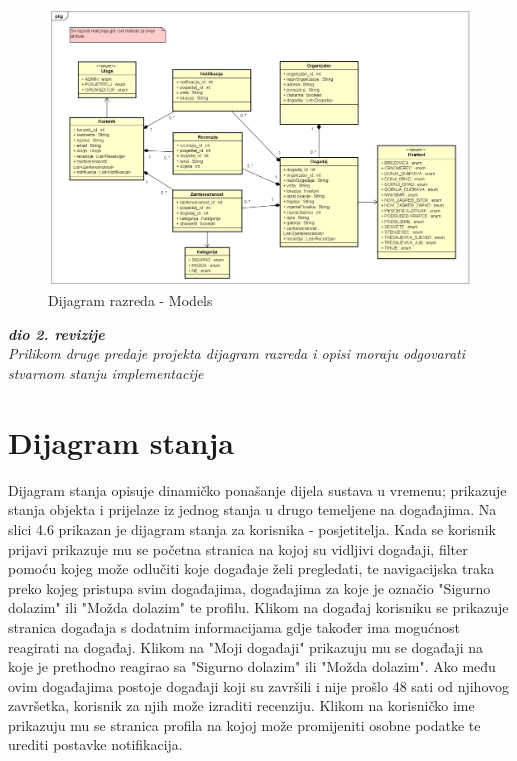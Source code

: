 			
			\begin{figure}[H]
				\includegraphics[scale=0.42]{dijagramiKlasa/Dijagram razreda - Models v5.png} %
				\centering
				\caption{Dijagram razreda - Models}
				\label{fig:promjene}
			\end{figure}
			
			\textbf{\textit{dio 2. revizije}}\\			
			
			\textit{Prilikom druge predaje projekta dijagram razreda i opisi moraju odgovarati stvarnom stanju implementacije}
			
			
			
			\eject
		
		\section{Dijagram stanja}
			
			
			Dijagram stanja opisuje dinamičko ponašanje dijela sustava u vremenu; prikazuje stanja objekta i prijelaze iz jednog stanja u drugo temeljene na događajima. Na slici 4.6 prikazan je dijagram stanja za korisnika - posjetitelja. Kada se korisnik prijavi prikazuje mu se početna stranica na kojoj su vidljivi događaji, filter pomoću kojeg može odlučiti koje događaje želi pregledati, te navigacijska traka preko kojeg pristupa svim događajima, događajima za koje je označio "Sigurno dolazim" ili "Možda dolazim" te profilu. Klikom na događaj korisniku se prikazuje stranica događaja s dodatnim informacijama gdje također ima mogućnost reagirati na događaj. Klikom na "Moji događaji" prikazuju mu se događaji na koje je prethodno reagirao sa "Sigurno dolazim" ili "Možda dolazim". Ako među ovim događajima postoje događaji koji su završili i nije prošlo 48 sati od njihovog završetka, korisnik za njih može izraditi recenziju. Klikom na korisničko ime prikazuju mu se stranica profila na kojoj može promijeniti osobne podatke te urediti postavke notifikacija.
			
